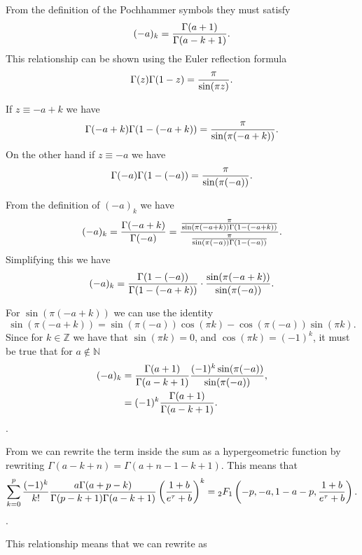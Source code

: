 From the definition of the Pochhammer symbols they must satisfy
\begin{equation}
  (-a)_k = {\Gamma (a + 1) \over \Gamma (a - k + 1)}.
\end{equation}
This relationship can be shown using the Euler reflection formula
\begin{equation}
  \Gamma (z) \Gamma (1 - z) = {\pi \over \sin (\pi z)}.
\end{equation}

If $z \equiv -a + k$ we have
\begin{equation}
  \Gamma(-a + k) \Gamma(1 - (-a + k)) = {\pi \over \sin(\pi (-a + k))}.
\end{equation}
On the other hand if $z \equiv -a$ we have
\begin{equation}
  \Gamma(-a) \Gamma(1 - (-a)) = {\pi \over \sin(\pi (-a))}.
\end{equation}

From the definition of $(-a)_k$ we have
\begin{equation}
  (-a)_k = {\Gamma(-a + k) \over \Gamma(-a)}
         = {{\pi \over \sin(\pi (-a + k)) \Gamma(1 - (-a + k))}
         \over
           {\pi \over \sin(\pi(-a)) \Gamma(1 - (-a))}}.
\end{equation}
Simplifying this we have
\begin{equation}
  (-a)_k = {\Gamma(1 - (-a)) \over \Gamma(1 - (-a + k))}\cdot
           {\sin(\pi (-a + k)) \over \sin(\pi (-a))}.
\end{equation}

For $\sin(\pi (-a + k))$ we can use the identity
\begin{equation}
  \sin(\pi (-a + k)) = \sin(\pi (-a)) \cos(\pi k) -
                       \cos(\pi (-a)) \sin(\pi k).
\end{equation}
Since for $k \in \mathbb{Z}$ we have that $\sin(\pi k) = 0$, and
$\cos(\pi k) = (-1)^k$, it must be true that for $a \notin \mathbb{N}$
\begin{align}
  (-a)_k &= {\Gamma(a + 1) \over \Gamma(a - k + 1)}
           {(-1)^k \sin(\pi (-a)) \over \sin(\pi (-a))},\\
         &= (-1)^k {\Gamma(a + 1) \over \Gamma(a - k + 1)}.
\end{align}
.

From  we can rewrite the term inside the sum as a
hypergeometric function by rewriting $\Gamma(a - k + n) =
\Gamma(a + n - 1 - k + 1)$. This means that
\begin{equation}
  \sum_{k=0}^p {(-1)^k \over k!}
  {a \Gamma(a + p - k) \over \Gamma(p - k + 1) \Gamma(a - k + 1)}
  \left( {1 + b \over e^\tau + b} \right)^k =
  {}_2F_1 \left( -p, -a, 1 - a - p, {1 + b \over e^\tau + b}   \right).
\end{equation}
.

This relationship means that we can rewrite  as
